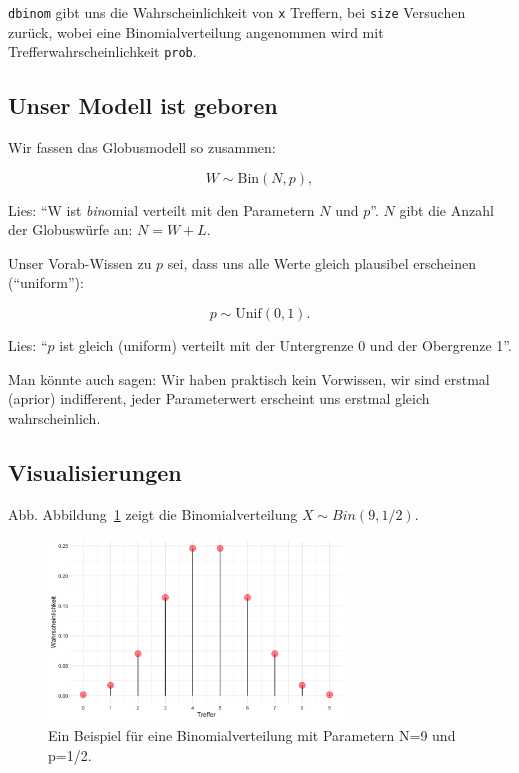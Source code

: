 \documentclass[
  a4paper,
  DIV=11]{scrreprt}
\theoremstyle{definition}
\theoremstyle{remark}
\begin{document}
\texttt{dbinom} gibt uns die Wahrscheinlichkeit von \texttt{x} Treffern,
bei \texttt{size} Versuchen zurück, wobei eine Binomialverteilung
angenommen wird mit Trefferwahrscheinlichkeit \texttt{prob}.

\hypertarget{unser-modell-ist-geboren}{%
\subsection{Unser Modell ist geboren}\label{unser-modell-ist-geboren}}

Wir fassen das Globusmodell so zusammen:

\[W \sim \text{Bin}(N,p),\]

Lies: ``W ist \emph{bin}omial verteilt mit den Parametern \(N\) und
\(p\)''. \(N\) gibt die Anzahl der Globuswürfe an: \(N=W+L\).

Unser Vorab-Wissen zu \(p\) sei, dass uns alle Werte gleich plausibel
erscheinen (``uniform''):

\[p \sim \text{Unif}(0,1).\]

Lies: ``\(p\) ist gleich (uniform) verteilt mit der Untergrenze 0 und
der Obergrenze 1''.

Man könnte auch sagen: Wir haben praktisch kein Vorwissen, wir sind
erstmal (aprior) indifferent, jeder Parameterwert erscheint uns erstmal
gleich wahrscheinlich.

\hypertarget{visualisierungen}{%
\subsection{Visualisierungen}\label{visualisierungen}}

Abb. Abbildung~\ref{fig-bin-klein} zeigt die Binomialverteilung
\(X \sim Bin(9, 1/2)\).

\begin{figure}

{\centering \includegraphics[width=0.7\textwidth,height=\textheight]{./img/fig-bin-klein.png}

}

\caption{\label{fig-bin-klein}Ein Beispiel für eine Binomialverteilung
mit Parametern N=9 und p=1/2.}

\end{figure}
\end{document}
